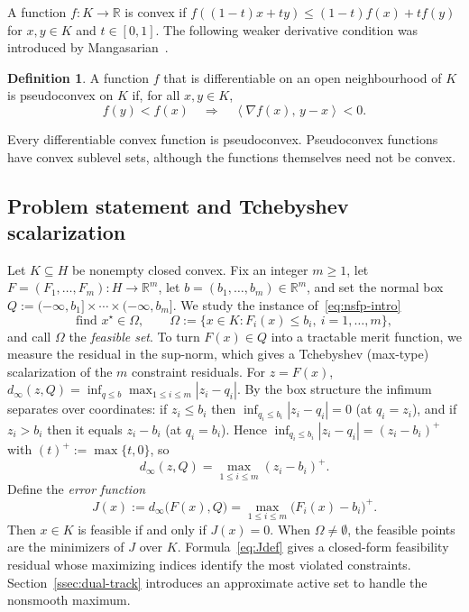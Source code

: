 \documentclass[]{interact}
\theoremstyle{plain}
\theoremstyle{definition}
\newtheorem{definition}[theorem]{Definition}
\theoremstyle{remark}
\newcommand{\R}{\mathbb{R}}
\newcommand{\abs}[1]{\left\lvert #1 \right\rvert}
\newcommand{\inner}[2]{\left\langle #1,\, #2 \right\rangle}
\begin{document}
A function $f:K\to\R$ is convex if $f((1-t)x+ty)\le(1-t)f(x)+tf(y)$ for $x,y\in K$ and $t\in[0,1]$. The following weaker derivative condition was introduced by Mangasarian~\citep{mangasarian1965}.
\begin{definition}\label{def:pseudoconvex}
A function $f$ that is differentiable on an open neighbourhood of $K$ is pseudoconvex on $K$ if, for all $x,y\in K$,
\begin{equation}\label{eq:contrapositive}
f(y)<f(x)\quad\Longrightarrow\quad\inner{\nabla f(x)}{y-x}<0.
\end{equation}
\end{definition}
Every differentiable convex function is pseudoconvex. Pseudoconvex functions have convex sublevel sets, although the functions themselves need not be convex.

\subsection{Problem statement and Tchebyshev scalarization}\label{ssec:model-stmt}
Let $K\subseteq H$ be nonempty closed convex. Fix an integer $m\ge1$, let $F=(F_1,\dots,F_m):H\to\R^m$, let $b=(b_1,\dots,b_m)\in\R^m$, and set the normal box $Q:=(-\infty,b_1]\times\cdots\times(-\infty,b_m]$. We study the instance of~\eqref{eq:nsfp-intro}
\begin{equation}\label{eq:nsfp-box}
\text{find } x^\star\in\Omega,\qquad
\Omega:=\bigl\{x\in K: F_i(x)\le b_i,\ i=1,\dots,m\bigr\},
\end{equation}
and call $\Omega$ the \emph{feasible set}. To turn $F(x)\in Q$ into a tractable merit function, we measure the residual in the sup-norm, which gives a Tchebyshev (max-type) scalarization of the $m$ constraint residuals. For $z=F(x)$, $d_\infty(z,Q)=\inf_{q\le b}\max_{1\le i\le m}\abs{z_i-q_i}$. By the box structure the infimum separates over coordinates: if $z_i\le b_i$ then $\inf_{q_i\le b_i}\abs{z_i-q_i}=0$ (at $q_i=z_i$), and if $z_i>b_i$ then it equals $z_i-b_i$ (at $q_i=b_i$). Hence $\inf_{q_i\le b_i}\abs{z_i-q_i}=(z_i-b_i)^+$ with $(t)^+:=\max\{t,0\}$, so
\begin{equation}\label{eq:dinfty}
d_\infty(z,Q)=\max_{1\le i\le m}(z_i-b_i)^+ .
\end{equation}
Define the \emph{error function}
\begin{equation}\label{eq:Jdef}
J(x):=d_\infty\bigl(F(x),Q\bigr)=\max_{1\le i\le m}\bigl(F_i(x)-b_i\bigr)^+ .
\end{equation}
Then $x\in K$ is feasible if and only if $J(x)=0$. When $\Omega\ne\emptyset$, the feasible points are the minimizers of $J$ over $K$. Formula~\eqref{eq:Jdef} gives a closed-form feasibility residual whose maximizing indices identify the most violated constraints. Section~\ref{ssec:dual-track} introduces an approximate active set to handle the nonsmooth maximum.
\end{document}
